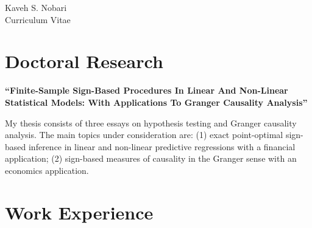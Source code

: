 \documentclass[10pt]{article} %
\begin{document}
\begin{paracol}{2} %


\parbox[top][0.12\textheight][c]{\linewidth}{ %
	\vspace{-0.04\textheight} %
	\centering %
	{\sffamily\Huge Kaveh S. Nobari}\\\medskip %
	{\Huge\color{headings}\cvtextfont Curriculum Vitae}
}


\section{Doctoral Research}

{\raggedright\textbf{\textquotedblleft Finite-Sample Sign-Based Procedures In Linear And Non-Linear Statistical Models: With Applications To Granger Causality Analysis\textquotedblright}\\\medskip}

My thesis consists of three essays on hypothesis testing and Granger cau\-sality analysis. The main topics under consideration are: (1) exact point-optimal sign-based inference in linear and non-linear predictive regre\-ssions with a financial application; (2) sign-based measures of causa\-lity in the Granger sense with an economics application. 

\medskip %


\section{Work Experience}


\end{paracol}
\end{document}
